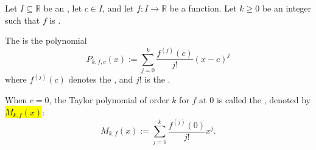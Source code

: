 \begin{definition} \label{definition:taylor_polynomial_of_real_valued_function_k_times_differentiable_at_a_point}
    Let $I \subseteq \mathbb{R}$ be an , let $c \in I$, and let $f : I \to \mathbb{R}$ be a function. Let $k \geq 0$ be an integer such that $f$ is .

    The  is the polynomial
    $$P_{k,f,c}(x) := \sum_{j=0}^k \frac{f^{(j)}(c)}{j!} (x - c)^j$$
    where $f^{(j)}(c)$ denotes the , and $j!$ is the .

    When $c = 0$, the Taylor polynomial of order $k$ for $f$ at $0$ is called the , denoted by \hl{$M_{k,f}(x)$}:
    $$M_{k,f}(x) := \sum_{j=0}^k \frac{f^{(j)}(0)}{j!} x^j.$$
\end{definition}
